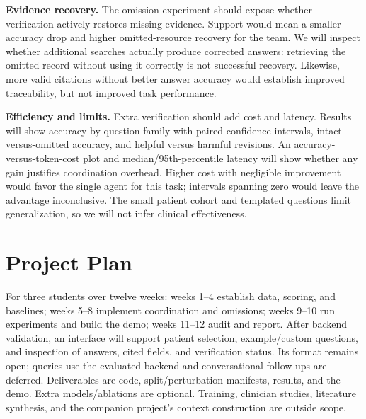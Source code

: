 \documentclass[sigconf,nonacm]{acmart}
\begin{document}
\textbf{Evidence recovery.} The omission experiment should expose whether verification actively restores missing evidence. Support would mean a smaller accuracy drop and higher omitted-resource recovery for the team. We will inspect whether additional searches actually produce corrected answers: retrieving the omitted record without using it correctly is not successful recovery. Likewise, more valid citations without better answer accuracy would establish improved traceability, but not improved task performance.

\textbf{Efficiency and limits.} Extra verification should add cost and latency. Results will show accuracy by question family with paired confidence intervals, intact-versus-omitted accuracy, and helpful versus harmful revisions. An accuracy-versus-token-cost plot and median/95th-percentile latency will show whether any gain justifies coordination overhead. Higher cost with negligible improvement would favor the single agent for this task; intervals spanning zero would leave the advantage inconclusive. The small patient cohort and templated questions limit generalization, so we will not infer clinical effectiveness.

\section{Project Plan}
For three students over twelve weeks: weeks 1--4 establish data, scoring, and baselines; weeks 5--8 implement coordination and omissions; weeks 9--10 run experiments and build the demo; weeks 11--12 audit and report. After backend validation, an interface will support patient selection, example/custom questions, and inspection of answers, cited fields, and verification status. Its format remains open; queries use the evaluated backend and conversational follow-ups are deferred. Deliverables are code, split/perturbation manifests, results, and the demo. Extra models/ablations are optional. Training, clinician studies, literature synthesis, and the companion project's context construction are outside scope.
\end{document}
